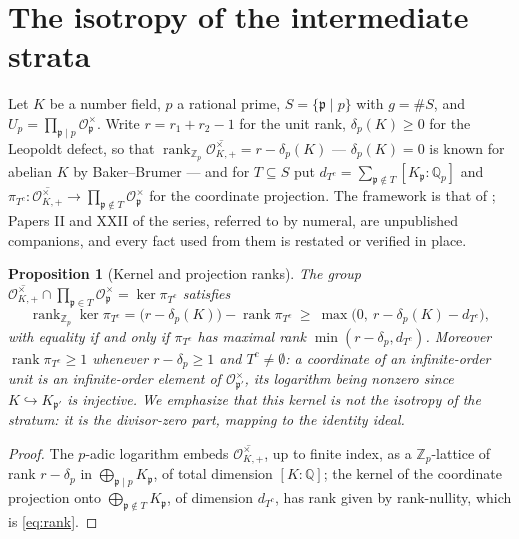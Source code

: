 \documentclass[11pt]{amsart}
\numberwithin{equation}{section}
\newtheorem{proposition}[theorem]{Proposition}
\theoremstyle{definition}
\theoremstyle{remark}
\newcommand{\Z}{\mathbb{Z}}
\newcommand{\Q}{\mathbb{Q}}
\newcommand{\cO}{\mathcal{O}}
\newcommand{\pp}{\mathfrak{p}}
\newcommand{\rank}{\operatorname{rank}}
\begin{document}
\maketitle

\section{The isotropy of the intermediate strata}

Let $K$ be a number field, $p$ a rational prime, $S=\{\pp\mid p\}$ with $g=\#S$, and
$U_p=\prod_{\pp\mid p}\cO_\pp^\times$. Write $r=r_1+r_2-1$ for the unit rank, $\delta_p(K)\ge0$
for the Leopoldt defect, so that $\rank_{\Z_p}\overline{\cO^\times_{K,+}}=r-\delta_p(K)$
\cite{Washington} --- $\delta_p(K)=0$ is known for abelian $K$ by Baker--Brumer
\cite{Brumer} --- and
for $T\subseteq S$ put $d_{T^c}=\sum_{\pp\notin T}[K_\pp:\Q_p]$ and
$\pi_{T^c}:\overline{\cO^\times_{K,+}}\to\prod_{\pp\notin T}\cO_\pp^\times$ for the
coordinate projection. The framework is that of \cite{Main}; Papers II and XXII of the
series, referred to by numeral, are unpublished companions, and every fact used from them is
restated or verified in place.

\begin{proposition}[Kernel and projection ranks]\label{prop:rank}
The group $\overline{\cO^\times_{K,+}}\cap\prod_{\pp\in T}\cO_\pp^\times=\ker\pi_{T^c}$
satisfies
\begin{equation}\label{eq:rank}
\rank_{\Z_p}\ker\pi_{T^c}
=\bigl(r-\delta_p(K)\bigr)-\rank\pi_{T^c}
\ \ge\ \max\bigl(0,\ r-\delta_p(K)-d_{T^c}\bigr),
\end{equation}
with equality if and only if $\pi_{T^c}$ has maximal rank $\min(r-\delta_p,d_{T^c})$.
Moreover $\rank\pi_{T^c}\ge1$ whenever $r-\delta_p\ge1$ and $T^c\ne\emptyset$: a coordinate
of an infinite-order unit is an infinite-order element of $\cO_{\pp'}^\times$, its logarithm
being nonzero since $K\hookrightarrow K_{\pp'}$ is injective. We emphasize that this kernel
is \emph{not} the isotropy of the stratum: it is the divisor-zero part, mapping to the
identity ideal.
\end{proposition}

\begin{proof}
The $p$-adic logarithm embeds $\overline{\cO^\times_{K,+}}$, up to finite index, as a
$\Z_p$-lattice of rank $r-\delta_p$ in $\bigoplus_{\pp\mid p}K_\pp$, of total dimension
$[K:\Q]$; the kernel of the coordinate projection onto
$\bigoplus_{\pp\notin T}K_\pp$, of dimension $d_{T^c}$, has rank given by rank-nullity,
which is \eqref{eq:rank}.
\end{proof}
\end{document}
